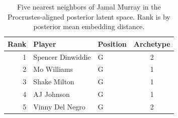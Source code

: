 \begin{table}[htbp]
  \centering\small
  \begin{tabular}{rllc}
    \toprule
    Rank & Player & Position & Archetype \\
    \midrule
    1 & Spencer Dinwiddie & G & 2 \\
    2 & Mo Williams & G & 1 \\
    3 & Shake Milton & G & 1 \\
    4 & AJ Johnson & G & 1 \\
    5 & Vinny Del Negro & G & 2 \\
    \bottomrule
  \end{tabular}
  \caption{Five nearest neighbors of Jamal Murray in the Procrustes-aligned posterior latent space. Rank is by posterior mean embedding distance.}
  \label{tab:Jamal_Murray_neighbors}
\end{table}

